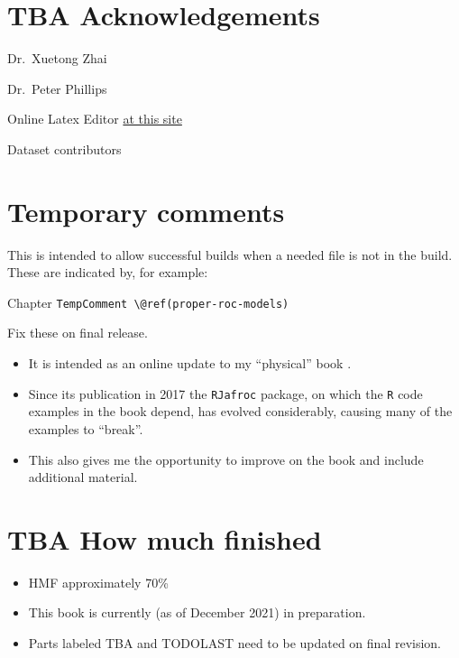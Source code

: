 \documentclass[
]{book}
\providecommand{\tightlist}{%
  \setlength{\itemsep}{0pt}\setlength{\parskip}{0pt}}
\begin{document}
\hypertarget{tba-acknowledgements}{%
\section{TBA Acknowledgements}\label{tba-acknowledgements}}

Dr.~Xuetong Zhai

Dr.~Peter Phillips

Online Latex Editor \href{https://latexeditor.lagrida.com/}{at this site}

Dataset contributors

\hypertarget{temporary-comments}{%
\section{Temporary comments}\label{temporary-comments}}

This is intended to allow successful builds when a needed file is not in the build. These are indicated by, for example:

Chapter \texttt{TempComment\ \textbackslash{}@ref(proper-roc-models)}

Fix these on final release.

\begin{itemize}
\tightlist
\item
  It is intended as an online update to my ``physical'' book \citep{chakraborty2017observer}.
\item
  Since its publication in 2017 the \texttt{RJafroc} package, on which the \texttt{R} code examples in the book depend, has evolved considerably, causing many of the examples to ``break''.
\item
  This also gives me the opportunity to improve on the book and include additional material.
\end{itemize}

\hypertarget{tba-how-much-finished}{%
\section*{TBA How much finished}\label{tba-how-much-finished}}

\begin{itemize}
\tightlist
\item
  HMF approximately 70\%
\item
  This book is currently (as of December 2021) in preparation.
\item
  Parts labeled TBA and TODOLAST need to be updated on final revision.
\end{itemize}
\end{document}
